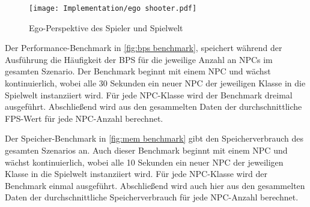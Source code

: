 \begin{figure}[h]
  \centering
  \texttt{[image: Implementation/ego shooter.pdf]}
	\captionsetup{justification=justified, format=plain}
  \caption{Ego-Perspektive des Spieler und Spielwelt}
  \label{fig:ego shooter}
\end{figure}

Der Performance-Benchmark in \ref{fig:bps benchmark}, speichert während der Ausführung die Häufigkeit der BPS für die jeweilige Anzahl an NPCs im gesamten Szenario. Der Benchmark beginnt mit einem NPC und wächst kontinuierlich, wobei alle 30 Sekunden ein neuer NPC der jeweiligen Klasse in die Spielwelt instanziiert wird. Für jede NPC-Klasse wird der Benchmark dreimal ausgeführt. Abschlie\ss{}end wird aus den gesammelten Daten der durchschnittliche FPS-Wert für jede NPC-Anzahl berechnet.

Der Speicher-Benchmark in \ref{fig:mem benchmark} gibt den Speicherverbrauch des gesamten Szenarios an. Auch dieser Benchmark beginnt mit einem NPC und wächst kontinuierlich, wobei alle 10 Sekunden ein neuer NPC der jeweiligen Klasse in die Spielwelt instanziiert wird. Für jede NPC-Klasse wird der Benchmark einmal ausgeführt. Abschlie\ss{}end wird auch hier aus den gesammelten Daten der durchschnittliche Speicherverbrauch für jede NPC-Anzahl berechnet.

